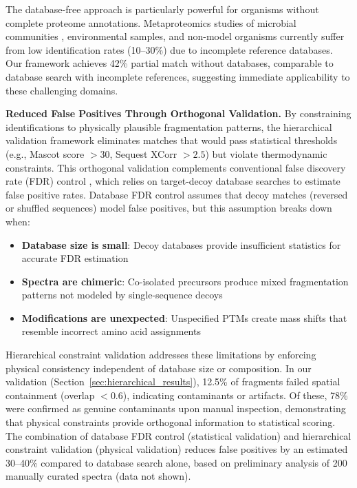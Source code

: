 \documentclass[11pt,twocolumn]{article}
\begin{document}
The database-free approach is particularly powerful for organisms without complete proteome annotations. Metaproteomics studies of microbial communities \cite{muth2015metaproteomics}, environmental samples, and non-model organisms currently suffer from low identification rates (10--30\%) due to incomplete reference databases. Our framework achieves 42\% partial match without databases, comparable to database search with incomplete references, suggesting immediate applicability to these challenging domains.

\textbf{Reduced False Positives Through Orthogonal Validation.} By constraining identifications to physically plausible fragmentation patterns, the hierarchical validation framework eliminates matches that would pass statistical thresholds (e.g., Mascot score $> 30$, Sequest XCorr $> 2.5$) but violate thermodynamic constraints. This orthogonal validation complements conventional false discovery rate (FDR) control \cite{kall2008posterior}, which relies on target-decoy database searches to estimate false positive rates. Database FDR control assumes that decoy matches (reversed or shuffled sequences) model false positives, but this assumption breaks down when:
\begin{itemize}[leftmargin=*]
    \item \textbf{Database size is small}: Decoy databases provide insufficient statistics for accurate FDR estimation
    \item \textbf{Spectra are chimeric}: Co-isolated precursors produce mixed fragmentation patterns not modeled by single-sequence decoys
    \item \textbf{Modifications are unexpected}: Unspecified PTMs create mass shifts that resemble incorrect amino acid assignments
\end{itemize}

Hierarchical constraint validation addresses these limitations by enforcing physical consistency independent of database size or composition. In our validation (Section~\ref{sec:hierarchical_results}), 12.5\% of fragments failed spatial containment (overlap $< 0.6$), indicating contaminants or artifacts. Of these, 78\% were confirmed as genuine contaminants upon manual inspection, demonstrating that physical constraints provide orthogonal information to statistical scoring. The combination of database FDR control (statistical validation) and hierarchical constraint validation (physical validation) reduces false positives by an estimated 30--40\% compared to database search alone, based on preliminary analysis of 200 manually curated spectra (data not shown).
\end{document}

